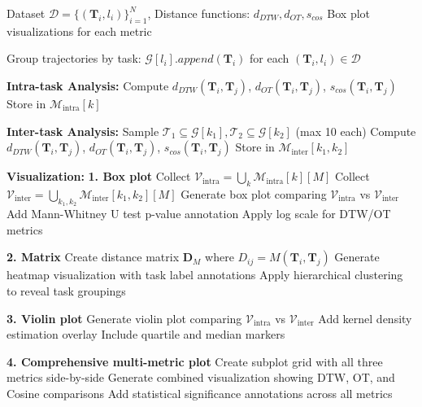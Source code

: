 \documentclass{article}
\begin{document}
\begin{algorithm}[H]
\caption{Intra-task vs Inter-task Metric Analysis}
\label{alg:intra_inter_analysis}
\begin{algorithmic}[1]
\REQUIRE Dataset $\mathcal{D} = \{(\mathbf{T}_i, l_i)\}_{i=1}^N$, Distance functions: $d_{DTW}, d_{OT}, s_{cos}$
\ENSURE Box plot visualizations for each metric

\STATE Group trajectories by task: $\mathcal{G}[l_i].append(\mathbf{T}_i)$ for each $(\mathbf{T}_i, l_i) \in \mathcal{D}$

\STATE \textbf{Intra-task Analysis:}
        \STATE Compute $d_{DTW}(\mathbf{T}_i, \mathbf{T}_j)$, $d_{OT}(\mathbf{T}_i, \mathbf{T}_j)$, $s_{cos}(\mathbf{T}_i, \mathbf{T}_j)$
        \STATE Store in $\mathcal{M}_{\text{intra}}[k]$
    \ENDFOR
\ENDFOR

\STATE \textbf{Inter-task Analysis:}
    \STATE Sample $\mathcal{T}_1 \subseteq \mathcal{G}[k_1], \mathcal{T}_2 \subseteq \mathcal{G}[k_2]$ (max 10 each)
        \STATE Compute $d_{DTW}(\mathbf{T}_i, \mathbf{T}_j)$, $d_{OT}(\mathbf{T}_i, \mathbf{T}_j)$, $s_{cos}(\mathbf{T}_i, \mathbf{T}_j)$
        \STATE Store in $\mathcal{M}_{\text{inter}}[k_1, k_2]$
    \ENDFOR
\ENDFOR

\STATE \textbf{Visualization:}
\STATE \textbf{1. Box plot}
    \STATE Collect $\mathcal{V}_{\text{intra}} = \bigcup_k \mathcal{M}_{\text{intra}}[k][M]$
    \STATE Collect $\mathcal{V}_{\text{inter}} = \bigcup_{k_1,k_2} \mathcal{M}_{\text{inter}}[k_1,k_2][M]$
    \STATE Generate box plot comparing $\mathcal{V}_{\text{intra}}$ vs $\mathcal{V}_{\text{inter}}$
    \STATE Add Mann-Whitney U test p-value annotation
    \STATE Apply log scale for DTW/OT metrics
\ENDFOR

\STATE \textbf{2. Matrix}
    \STATE Create distance matrix $\mathbf{D}_M$ where $D_{ij} = M(\mathbf{T}_i, \mathbf{T}_j)$
    \STATE Generate heatmap visualization with task label annotations
    \STATE Apply hierarchical clustering to reveal task groupings
\ENDFOR

\STATE \textbf{3. Violin plot}
    \STATE Generate violin plot comparing $\mathcal{V}_{\text{intra}}$ vs $\mathcal{V}_{\text{inter}}$
    \STATE Add kernel density estimation overlay
    \STATE Include quartile and median markers
\ENDFOR

\STATE \textbf{4. Comprehensive multi-metric plot}
\STATE Create subplot grid with all three metrics side-by-side
\STATE Generate combined visualization showing DTW, OT, and Cosine comparisons
\STATE Add statistical significance annotations across all metrics
\end{algorithmic}
\end{algorithm}
\end{document}
